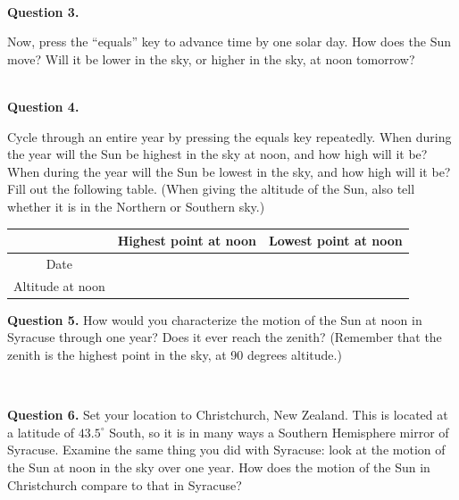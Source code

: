 \documentclass[11pt]{article}
\begin{document}
\vspace*{1.5cm}

\hrulefill\\
\noindent
\newpage
\textbf{Question 3.} 

Now, press the ``equals'' key to advance time by one solar day. How does the Sun move? Will it be lower in the sky, or 
higher in the sky, at noon tomorrow?

\vspace*{1.5cm}

\hrulefill\\
\textbf{Question 4.} 

Cycle through an entire year by pressing the equals key repeatedly. When during the year will the Sun be highest in the sky
at noon, and how high will it be? When during the year will the Sun be lowest in the sky, and how high will it be? Fill out 
the following table.
(When giving the altitude of the Sun, also tell whether it is in the Northern or Southern sky.) 
\renewcommand{\arraystretch}{2}

\vspace{1cm}
\begin{center}
\begin{tabular}{|c| c |c|}
\hline
 & Highest point at noon & Lowest point at noon \\
\hline
Date & & \\
\hline
Altitude at noon & & \\
\hline
\end{tabular}
\normalsize
\end{center}


\textbf{Question 5.} 
How would you characterize the motion of the Sun at noon in Syracuse through one year? Does it ever reach the zenith? (Remember that the zenith is the highest point in the sky, at 90 degrees altitude.)

\vspace*{1.5cm}
\hrulefill\\

\newpage

\textbf{Question 6.}
Set your location to Christchurch, New Zealand. This is located at a latitude of $43.5^\circ$ South, so it is in many ways a Southern Hemisphere mirror of Syracuse. Examine the same thing you did with Syracuse: look at the motion of the 
Sun at noon in the sky over one year. How does the motion of the Sun in Christchurch compare to that in Syracuse?
\end{document}
